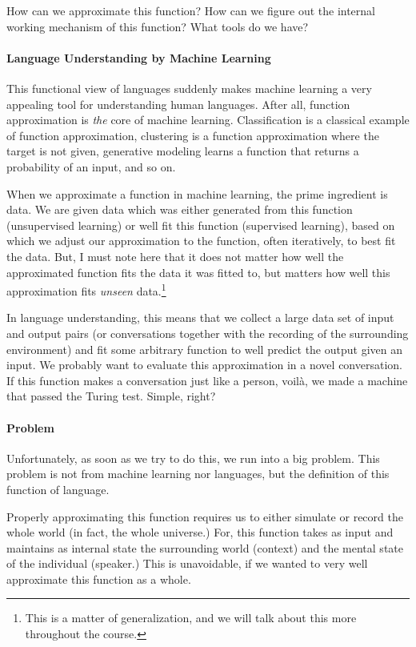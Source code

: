 \documentclass{report}
\begin{document}
How can we approximate this function? How can we figure out the internal working
mechanism of this function? What tools do we have?

\paragraph{Language Understanding by Machine Learning}
This functional view of languages suddenly makes machine learning a very
appealing tool for understanding human languages. After all, function
approximation is {\em the} core of machine learning. Classification is a
classical example of function approximation, clustering is a function
approximation where the target is not given, generative modeling learns a
function that returns a probability of an input, and so on.

When we approximate a function in machine learning, the prime ingredient is
data. We are given data which was either generated from this function
(unsupervised learning) or well fit this function (supervised learning), based
on which we adjust our approximation to the function, often iteratively, to best
fit the data. But, I must note here that it does not matter how well the approximated
function fits the data it was fitted to, but matters how well this approximation fits
{\em unseen} data.\footnote{
    This is a matter of generalization, and we will talk
    about this more throughout the course.
}

In language understanding, this means that we collect a large data set of input
and output pairs (or conversations together with the recording of the
surrounding environment) and fit some arbitrary function to well predict the
output given an input. We probably want to evaluate this approximation in a
novel conversation. If this function makes a conversation just like a person,
voil\`{a}, we made a machine that passed the Turing test.  Simple, right?

\paragraph{Problem}
Unfortunately, as soon as we try to do this, we run into a big problem. This
problem is not from machine learning nor languages, but the definition of this
function of language.

Properly approximating this function requires us to either simulate or record
the whole world (in fact, the whole universe.) For, this function takes as input
and maintains as internal state the surrounding world (context) and the mental
state of the individual (speaker.) This is unavoidable, if we wanted to very
well approximate this function as a whole.
\end{document}

